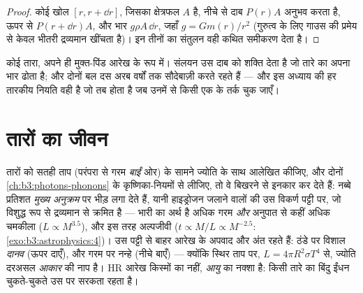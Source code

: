 \begin{proof}
कोई खोल $[r, r + \dd r]$, जिसका क्षेत्रफल $A$ है, नीचे से दाब $P(r)A$
अनुभव करता है, ऊपर से $P(r + \dd r)A$, और भार $g\rho A\,\dd r$,
जहाँ $g = Gm(r)/r^2$ (गुरुत्व के लिए गाउस की प्रमेय से केवल भीतरी
द्रव्यमान खींचता है)। इन तीनों का संतुलन वही कथित
समीकरण देता है।
\end{proof}

\begin{omfigure}

{\small कोई तारा, अपने ही मुक्त-पिंड आरेख के रूप में। संलयन उस दाब को
शक्ति देता है जो तारे का अपना भार ढोता है; और दोनों बल दस अरब वर्षों
तक सौदेबाज़ी करते रहते हैं --- और इस अध्याय की हर तारकीय नियति वही है
जो तब होता है जब उनमें से किसी एक के तर्क चुक जाएँ।}
\end{omfigure}

\section{तारों का जीवन}

\begin{definition}[हर्ट्ज़्स्प्रुंग--रसेल आरेख]\label{def:b3:astrophysics:hr}
तारों को सतही ताप (परंपरा से गरम \emph{बाईं} ओर) के सामने
ज्योति के साथ आलेखित कीजिए, और दोनों
\cref{ch:b3:photons-phonons} के कृष्णिका-नियमों से लीजिए, तो वे
बिखरने से इनकार कर देते हैं: नब्बे प्रतिशत \emph{मुख्य अनुक्रम} पर
भीड़ लगा देते हैं, यानी हाइड्रोजन जलाने वालों की उस विकर्ण पट्टी पर,
जो विशुद्ध रूप से द्रव्यमान से क्रमित है --- भारी का अर्थ है अधिक गरम
\emph{और} अनुपात से कहीं अधिक चमकीला
($L \propto M^{3.5}$), और इस तरह अल्पजीवी
($t \propto M/L \propto M^{-2.5}$:
\cref{exo:b3:astrophysics:4})। उस पट्टी से बाहर आरेख के
अपवाद और अंत रहते हैं: ठंडे पर विशाल \emph{दानव}
(ऊपर दाएँ), और गरम पर नन्हे \emph{} (नीचे बाएँ)
--- क्योंकि स्थिर ताप पर, $L = 4\pi R^2\sigma T^4$ से,
ज्योति दरअसल \emph{आकार} की नाप है। HR आरेख किस्मों का नहीं,
\emph{आयु} का नक्शा है: किसी तारे का बिंदु ईंधन चुकते-चुकते उस पर
सरकता रहता है।
\end{definition}

